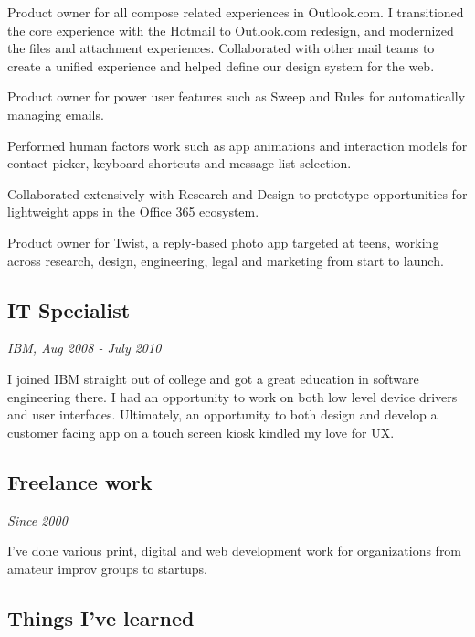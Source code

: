 \startitemize[packed]
\item
  Product owner for all compose related experiences in Outlook.com. I
  transitioned the core experience with the Hotmail to Outlook.com
  redesign, and modernized the files and attachment experiences.
  Collaborated with other mail teams to create a unified experience and
  helped define our design system for the web.
\item
  Product owner for power user features such as Sweep and Rules for
  automatically managing emails.
\item
  Performed human factors work such as app animations and interaction
  models for contact picker, keyboard shortcuts and message list
  selection.
\item
  Collaborated extensively with Research and Design to prototype
  opportunities for lightweight apps in the Office 365 ecosystem.
\item
  Product owner for Twist, a reply-based photo app targeted at teens,
  working across research, design, engineering, legal and marketing from
  start to launch.
\stopitemize

\subsection[it-specialist]{IT Specialist}

{\em IBM, Aug 2008 - July 2010}

\startitemize[packed]
\item
  I joined IBM straight out of college and got a great education in
  software engineering there. I had an opportunity to work on both low
  level device drivers and user interfaces. Ultimately, an opportunity
  to both design and develop a customer facing app on a touch screen
  kiosk kindled my love for UX.
\stopitemize

\subsection[freelance-work]{Freelance work}

{\em Since 2000}

\startitemize[packed]
\item
  I've done various print, digital and web development work for
  organizations from amateur improv groups to startups.
\stopitemize

\subsection[things-ive-learned]{Things I've learned}

